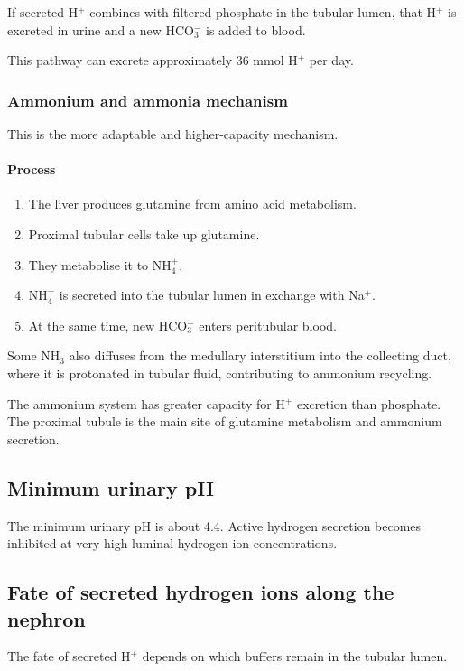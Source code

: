 \documentclass[11pt,a4paper]{article}
\begin{document}
If secreted H$^+$ combines with filtered phosphate in the tubular lumen, that H$^+$ is excreted in urine and a new HCO$_3^-$ is added to blood.

This pathway can excrete approximately 36 mmol H$^+$ per day.

\subsubsection{Ammonium and ammonia mechanism}

This is the more adaptable and higher-capacity mechanism.

\paragraph{Process}
\begin{enumerate}
    \item The liver produces glutamine from amino acid metabolism.
    \item Proximal tubular cells take up glutamine.
    \item They metabolise it to NH$_4^+$.
    \item NH$_4^+$ is secreted into the tubular lumen in exchange with Na$^+$.
    \item At the same time, new HCO$_3^-$ enters peritubular blood.
\end{enumerate}

Some NH$_3$ also diffuses from the medullary interstitium into the collecting duct, where it is protonated in tubular fluid, contributing to ammonium recycling.

The ammonium system has greater capacity for H$^+$ excretion than phosphate. The proximal tubule is the main site of glutamine metabolism and ammonium secretion.

\subsection{Minimum urinary pH}

The minimum urinary pH is about 4.4. Active hydrogen secretion becomes inhibited at very high luminal hydrogen ion concentrations.

\subsection{Fate of secreted hydrogen ions along the nephron}

The fate of secreted H$^+$ depends on which buffers remain in the tubular lumen.
\end{document}
